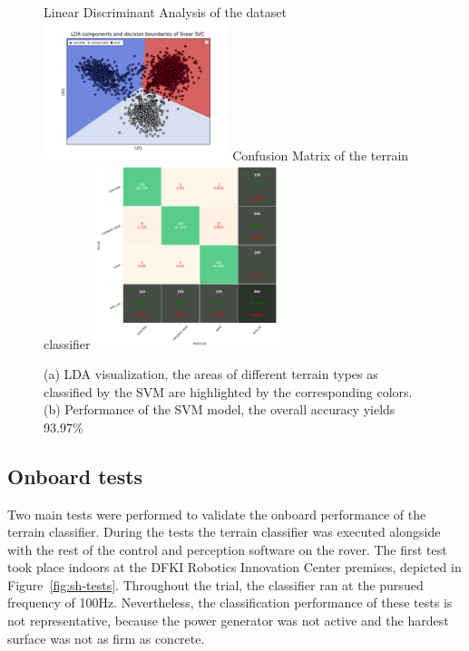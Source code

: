 \documentclass{article}
\begin{document}
\begin{figure}[!htb]
    \centering
    \subcaptionbox
        {Linear Discriminant Analysis of the dataset}
        {\includegraphics[width=0.48\textwidth]{../figures/boundary_LDA_prevTesting_all_sand_concrete_compactsand.png}}
    \subcaptionbox
        {Confusion Matrix of the terrain classifier}
        {\includegraphics[width=0.48\textwidth]{../figures/confusionmatrix_Train.png}}
    \caption{(a) LDA visualization, the areas of different terrain types as classified by the SVM are highlighted by the corresponding colors. (b) Performance of the SVM model, the overall accuracy yields 93.97\% }
    \label{fig:offline-class}
\end{figure}



\subsection{Onboard tests}

Two main tests were performed to validate the onboard performance of the terrain classifier. During the tests the terrain classifier was executed alongside with the rest of the control and perception software on the rover. The first test took place indoors at the DFKI Robotics Innovation Center premises, depicted in Figure~\ref{fig:sh-tests}. Throughout the trial, the classifier ran at the pursued frequency of 100Hz. Nevertheless, the classification performance of these tests is not representative, because the power generator was not active and the hardest surface was not as firm as concrete. 
\end{document}

